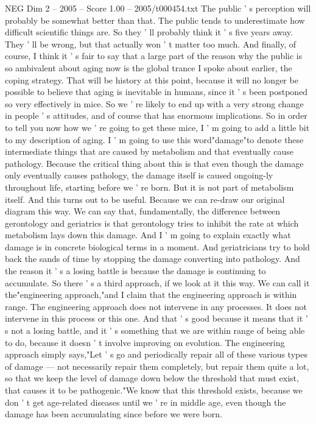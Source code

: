 \begin{textsample}{NEG Dim 2 – 2005 – Score 1.00 – 2005/t000454.txt}
The public ' s perception will probably be somewhat better than that.
The public tends to underestimate how difficult scientific things are.
So they ' ll probably think it ' s five years away.
They ' ll be wrong, but that actually won ' t matter too much.
And finally, of course, I think it ' s fair to say that a large part of the reason why the public is so ambivalent about aging now is the global trance I spoke about earlier, the coping strategy.
That will be history at this point, because it will no longer be possible to believe that aging is inevitable in humans, since it ' s been postponed so very effectively in mice.
So we ' re likely to end up with a very strong change in people ' s attitudes, and of course that has enormous implications.
So in order to tell you now how we ' re going to get these mice, I ' m going to add a little bit to my description of aging.
I ' m going to use this word"damage"to denote these intermediate things that are caused by metabolism and that eventually cause pathology.
Because the critical thing about this is that even though the damage only eventually causes pathology, the damage itself is caused ongoing-ly throughout life, starting before we ' re born.
But it is not part of metabolism itself.
And this turns out to be useful.
Because we can re-draw our original diagram this way.
We can say that, fundamentally, the difference between gerontology and geriatrics is that gerontology tries to inhibit the rate at which metabolism lays down this damage.
And I ' m going to explain exactly what damage is in concrete biological terms in a moment.
And geriatricians try to hold back the sands of time by stopping the damage converting into pathology.
And the reason it ' s a losing battle is because the damage is continuing to accumulate.
So there ' s a third approach, if we look at it this way.
We can call it the"engineering approach,"and I claim that the engineering approach is within range.
The engineering approach does not intervene in any processes.
It does not intervene in this process or this one.
And that ' s good because it means that it ' s not a losing battle, and it ' s something that we are within range of being able to do, because it doesn ' t involve improving on evolution.
The engineering approach simply says,"Let ' s go and periodically repair all of these various types of damage — not necessarily repair them completely, but repair them quite a lot, so that we keep the level of damage down below the threshold that must exist, that causes it to be pathogenic."We know that this threshold exists, because we don ' t get age-related diseases until we ' re in middle age, even though the damage has been accumulating since before we were born.

\end{textsample}
